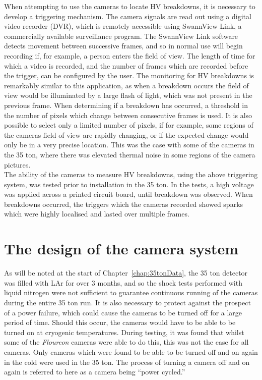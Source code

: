 When attempting to use the cameras to locate HV breakdowns, it is necessary to develop a triggering mechanism. The camera signals are read out using a digital video recorder (DVR), which is remotely accessible using SwannView Link, a commercially available surveillance program. The SwannView Link software detects movement between successive frames, and so in normal use will begin recording if, for example, a person enters the field of view. The length of time for which a video is recorded, and the number of frames which are recorded before the trigger, can be configured by the user. The monitoring for HV breakdowns is remarkably similar to this application, as when a breakdown occurs the field of view would be illuminated by a large flash of light, which was not present in the previous frame. When determining if a breakdown has occurred, a threshold in the number of pixels which change between consecutive frames is used. It is also possible to select only a limited number of pixels, if for example, some regions of the cameras field of view are rapidly changing, or if the expected change would only be in a very precise location. This was the case with some of the cameras in the 35 ton, where there was elevated thermal noise in some regions of the camera pictures. \\

The ability of the cameras to measure HV breakdowns, using the above triggering system, was tested prior to installation in the 35 ton. In the tests, a high voltage was applied across a printed circuit board, until breakdown was observed. When breakdowns occurred, the triggers which the cameras recorded showed sparks which were highly localised and lasted over multiple frames. \\

\section{The design of the camera system} \label{sec:CamDesign} %

As will be noted at the start of Chapter~\ref{chap:35tonData}, the 35 ton detector was filled with LAr for over 3 months, and so the shock tests performed with liquid nitrogen were not sufficient to guarantee continuous running of the cameras during the entire 35 ton run. It is also necessary to protect against the prospect of a power failure, which could cause the cameras to be turned off for a large period of time. Should this occur, the cameras would have to be able to be turned on at cryogenic temperatures. During testing, it was found that whilst some of the \emph{Floureon} cameras were able to do this, this was not the case for all cameras. Only cameras which were found to be able to be turned off and on again in the cold were used in the 35 ton. The process of turning a camera off and on again is referred to here as a camera being ``power cycled.'' \\

